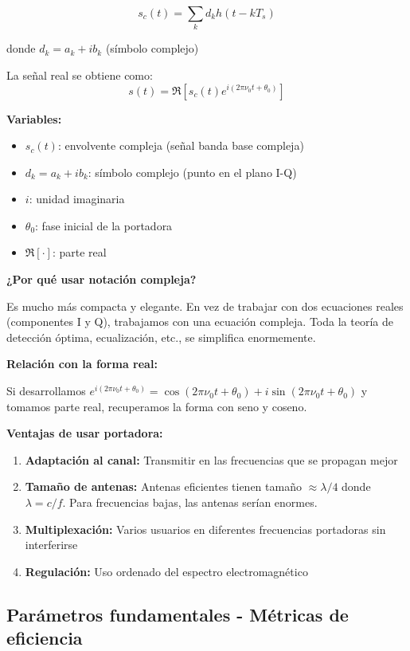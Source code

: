 \documentclass[11pt,a4paper]{article}
\begin{document}
\begin{tcolorbox}[colback=amarillo!40,colframe=azuloscuro,title=\textbf{Notación compleja (equivalente)}]
$$\boxed{s_c(t) = \sum_{k} d_k h(t-kT_s)}$$

donde $\boxed{d_k = a_k + ib_k}$ (símbolo complejo)

La señal real se obtiene como:
$$\boxed{s(t) = \Re[s_c(t)e^{i(2\pi\nu_0 t + \theta_0)}]}$$

\textbf{Variables:}
\begin{itemize}
\item $s_c(t)$: envolvente compleja (señal banda base compleja)
\item $d_k = a_k + ib_k$: símbolo complejo (punto en el plano I-Q)
\item $i$: unidad imaginaria
\item $\theta_0$: fase inicial de la portadora
\item $\Re[\cdot]$: parte real
\end{itemize}

\textbf{¿Por qué usar notación compleja?}

Es mucho más compacta y elegante. En vez de trabajar con dos ecuaciones reales (componentes I y Q), trabajamos con una ecuación compleja. Toda la teoría de detección óptima, ecualización, etc., se simplifica enormemente.

\textbf{Relación con la forma real:}

Si desarrollamos $e^{i(2\pi\nu_0 t + \theta_0)} = \cos(2\pi\nu_0 t + \theta_0) + i\sin(2\pi\nu_0 t + \theta_0)$ y tomamos parte real, recuperamos la forma con seno y coseno.
\end{tcolorbox}

\textbf{Ventajas de usar portadora:}
\begin{enumerate}
\item \textbf{Adaptación al canal:} Transmitir en las frecuencias que se propagan mejor
\item \textbf{Tamaño de antenas:} Antenas eficientes tienen tamaño $\approx \lambda/4$ donde $\lambda = c/f$. Para frecuencias bajas, las antenas serían enormes.
\item \textbf{Multiplexación:} Varios usuarios en diferentes frecuencias portadoras sin interferirse
\item \textbf{Regulación:} Uso ordenado del espectro electromagnético
\end{enumerate}

\subsection{Parámetros fundamentales - Métricas de eficiencia}
\end{document}
